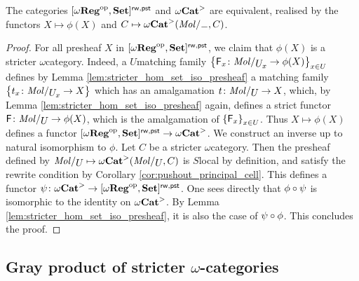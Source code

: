 \begin{prop} \label{prop:stricter_cat_are_local_presheaves}
    The categories \( [\omega\mathbf{Reg}^\mathrm{op}, \mathbf{Set}]^{\mathsf{rw, pst}} \) and \( {\omega\mathbf{Cat}}^> \) are equivalent, realised by the functors \( X \mapsto \phi(X) \) and \( C \mapsto \somegaCat(\molecin{-}, C) \). 
\end{prop}
\begin{proof}
    For all presheaf \( X \) in \( [\omega\mathbf{Reg}^\mathrm{op}, \mathbf{Set}]^{\mathsf{rw, pst}} \), we claim that \( \phi(X) \) is a stricter \( \omega \)\nbd category.
    Indeed, a \( U \)\nbd matching family \( \set{\F_x \colon \molecin{\imel{U}{x}} \to \phi(X)}_{x \in U} \) defines by Lemma \ref{lem:stricter_hom_set_iso_presheaf} a matching family \( \set{t_x \colon \molecin{\imel{U}{x}} \to X} \) which has an amalgamation \( t \colon \molecin{U} \to X \), which, by Lemma \ref{lem:stricter_hom_set_iso_presheaf} again, defines a strict functor \( \F \colon \molecin{U} \to \phi(X) \), which is the amalgamation of \( \left\{ {\mathsf{F}_x} \right\}_{x \in U} \). 
    Thus \( X \mapsto \phi(X) \) defines a functor \( [\omega\mathbf{Reg}^\mathrm{op}, \mathbf{Set}]^{\mathsf{rw, pst}} \to {\omega\mathbf{Cat}}^> \).
    We construct an inverse up to natural isomorphism to \( \phi \).
    Let \( C \) be a stricter \( \omega \)\nbd category.
    Then the presheaf defined by \(\molecin{U} \mapsto \somegaCat(\molecin{U}, C) \) is \( S \)\nbd local by definition, and satisfy the rewrite condition by Corollary \ref{cor:pushout_principal_cell}.
    This defines a functor \( \psi \colon {\omega\mathbf{Cat}}^> \to [\omega\mathbf{Reg}^\mathrm{op}, \mathbf{Set}]^{\mathsf{rw, pst}} \).
    One sees directly that \( \phi \circ \psi \) is isomorphic to the identity on \( {\omega\mathbf{Cat}}^> \). 
    By Lemma \ref{lem:stricter_hom_set_iso_presheaf}, it is also the case of \( \psi \circ \phi \).
    This concludes the proof.
\end{proof}


\subsection{Gray product of stricter \texorpdfstring{$\omega$}{ω}-categories}

